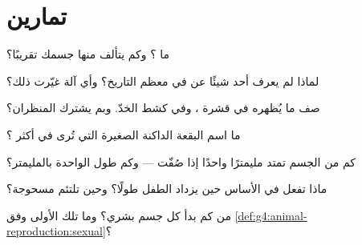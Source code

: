 \section{تمارين}

\begin{exercise}[$\star$]\label{exo:g5:first-look-at-cells:1}
ما ؟ وكم  يتألف منها جسمك تقريبًا؟
\end{exercise}

\begin{exercise}[$\star$]\label{exo:g5:first-look-at-cells:2}
لماذا لم يعرف أحد شيئًا عن  في معظم التاريخ؟ وأي آلة غيّرت
ذلك؟
\end{exercise}

\begin{exercise}[$\star$]\label{exo:g5:first-look-at-cells:3}
صف ما يُظهره  في قشرة ، وفي كشط الخدّ. وبم يشترك
المنظران؟
\end{exercise}

\begin{exercise}[$\star$]\label{exo:g5:first-look-at-cells:4}
ما اسم البقعة الداكنة الصغيرة التي تُرى في أكثر ؟
\end{exercise}

\begin{exercise}[$\star$]\label{exo:g5:first-look-at-cells:5}
كم  من  الجسم تمتد مليمترًا واحدًا إذا صُفّت --- وكم طول
 الواحدة بالمليمتر؟
\end{exercise}

\begin{exercise}[$\star$]\label{exo:g5:first-look-at-cells:6}
ماذا تفعل  في الأساس حين يزداد الطفل طولًا؟ وحين تلتئم 
مسحوجة؟
\end{exercise}

\begin{exercise}[$\star$]\label{exo:g5:first-look-at-cells:7}
من كم  بدأ كل جسم بشري؟ وما تلك  الأولى وفق
\cref{def:g4:animal-reproduction:sexual}؟
\end{exercise}

